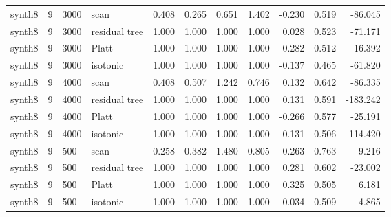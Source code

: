 \begin{tabular}{lrllrrrrrrr}
synth8 & 9 & 3000 & scan & 0.408 & 0.265 & 0.651 & 1.402 & -0.230 & 0.519 & -86.045 \\
synth8 & 9 & 3000 & residual tree & 1.000 & 1.000 & 1.000 & 1.000 & 0.028 & 0.523 & -71.171 \\
synth8 & 9 & 3000 & Platt & 1.000 & 1.000 & 1.000 & 1.000 & -0.282 & 0.512 & -16.392 \\
synth8 & 9 & 3000 & isotonic & 1.000 & 1.000 & 1.000 & 1.000 & -0.137 & 0.465 & -61.820 \\
synth8 & 9 & 4000 & scan & 0.408 & 0.507 & 1.242 & 0.746 & 0.132 & 0.642 & -86.335 \\
synth8 & 9 & 4000 & residual tree & 1.000 & 1.000 & 1.000 & 1.000 & 0.131 & 0.591 & -183.242 \\
synth8 & 9 & 4000 & Platt & 1.000 & 1.000 & 1.000 & 1.000 & -0.266 & 0.577 & -25.191 \\
synth8 & 9 & 4000 & isotonic & 1.000 & 1.000 & 1.000 & 1.000 & -0.131 & 0.506 & -114.420 \\
synth8 & 9 & 500 & scan & 0.258 & 0.382 & 1.480 & 0.805 & -0.263 & 0.763 & -9.216 \\
synth8 & 9 & 500 & residual tree & 1.000 & 1.000 & 1.000 & 1.000 & 0.281 & 0.602 & -23.002 \\
synth8 & 9 & 500 & Platt & 1.000 & 1.000 & 1.000 & 1.000 & 0.325 & 0.505 & 6.181 \\
synth8 & 9 & 500 & isotonic & 1.000 & 1.000 & 1.000 & 1.000 & 0.034 & 0.509 & 4.865 \\
\bottomrule
\end{tabular}
